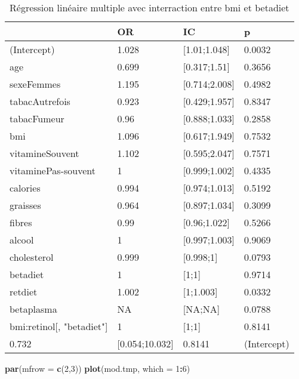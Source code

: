 \documentclass[]{article}
\newenvironment{Shaded}{\begin{snugshade}}{\end{snugshade}}
\newcommand{\KeywordTok}[1]{\textcolor[rgb]{0.13,0.29,0.53}{\textbf{#1}}}
\newcommand{\DataTypeTok}[1]{\textcolor[rgb]{0.13,0.29,0.53}{#1}}
\newcommand{\DecValTok}[1]{\textcolor[rgb]{0.00,0.00,0.81}{#1}}
\newcommand{\OperatorTok}[1]{\textcolor[rgb]{0.81,0.36,0.00}{\textbf{#1}}}
\newcommand{\NormalTok}[1]{#1}
\begin{document}
\begin{table}

\caption{\label{tab:unnamed-chunk-86}Régression linéaire multiple avec interraction entre bmi et betadiet}
\centering
\begin{tabular}[t]{l|l|l|l}
\hline
  & OR & IC & p\\
\hline
\rowcolor[HTML]{BBD2E1}  (Intercept) & 1.028 & [1.01;1.048] & 0.0032\\
\hline
age & 0.699 & [0.317;1.51] & 0.3656\\
\hline
\rowcolor[HTML]{BBD2E1}  sexeFemmes & 1.195 & [0.714;2.008] & 0.4982\\
\hline
tabacAutrefois & 0.923 & [0.429;1.957] & 0.8347\\
\hline
\rowcolor[HTML]{BBD2E1}  tabacFumeur & 0.96 & [0.888;1.033] & 0.2858\\
\hline
bmi & 1.096 & [0.617;1.949] & 0.7532\\
\hline
\rowcolor[HTML]{BBD2E1}  vitamineSouvent & 1.102 & [0.595;2.047] & 0.7571\\
\hline
vitaminePas-souvent & 1 & [0.999;1.002] & 0.4335\\
\hline
\rowcolor[HTML]{BBD2E1}  calories & 0.994 & [0.974;1.013] & 0.5192\\
\hline
graisses & 0.964 & [0.897;1.034] & 0.3099\\
\hline
\rowcolor[HTML]{BBD2E1}  fibres & 0.99 & [0.96;1.022] & 0.5266\\
\hline
alcool & 1 & [0.997;1.003] & 0.9069\\
\hline
\rowcolor[HTML]{BBD2E1}  cholesterol & 0.999 & [0.998;1] & 0.0793\\
\hline
betadiet & 1 & [1;1] & 0.9714\\
\hline
\rowcolor[HTML]{BBD2E1}  retdiet & 1.002 & [1;1.003] & 0.0332\\
\hline
betaplasma & NA & [NA;NA] & 0.0788\\
\hline
\rowcolor[HTML]{BBD2E1}  bmi:retinol[, "betadiet"] & 1 & [1;1] & 0.8141\\
\hline
0.732 & [0.054;10.032] & 0.8141 & (Intercept)\\
\hline
\end{tabular}
\end{table}

\begin{Shaded}
\begin{Highlighting}[]
\KeywordTok{par}\NormalTok{(}\DataTypeTok{mfrow =} \KeywordTok{c}\NormalTok{(}\DecValTok{2}\NormalTok{,}\DecValTok{3}\NormalTok{))}
\KeywordTok{plot}\NormalTok{(mod.tmp, }\DataTypeTok{which =} \DecValTok{1}\OperatorTok{:}\DecValTok{6}\NormalTok{)}
\end{Highlighting}
\end{Shaded}
\end{document}
